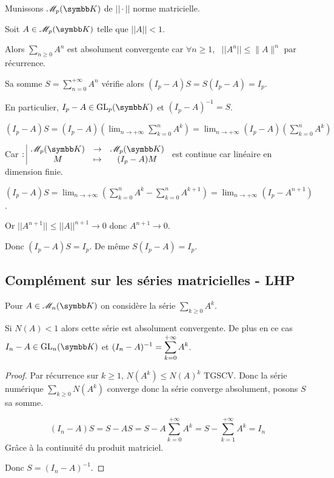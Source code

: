 \begin{exemple}
    Munissons $\mathscr M_p (\K)$ de $|| \cdot ||$ norme matricielle. 

    Soit $A \in \mathscr M_p(\K)$ telle que $|| A || < 1$. 

    Alors $\sum_{n \geqslant 0 } A^n$ est absolument convergente car 
    $\forall n \geqslant 1$, \, $|| A^n || \leqslant \|A\|^n$ par récurrence. 

    Sa somme $\displaystyle S = \sum_{n = 0}^{+ \infty } A^n$ vérifie alors $(I_p - A) S = S(I_p - A) = I_p$.

    En particulier, $I_p - A \in \operatorname{GL}_p (\K)$ et $(I_p - A)^{-1} = S$. 

    $\displaystyle (I_p - A)S = (I_p - A) \left(\lim_{n \to + \infty} \sum_{k = 0 }^{n } A^k \right) = \lim_{n \to + \infty} (I_p - A) \left( \sum_{k = 0}^{n } A^k \right) $

    Car $\fonction {}{\mathscr M_p(\K)}{\mathscr M_p(\K)}{M}{(I_p - A)M}$ est continue car linéaire
    en dimension finie. 

    $\displaystyle (I_p - A)S = \lim_{n \to + \infty} \left( \sum_{k = 0}^{n } A^k - \sum_{k = 0}^{n } A^{k + 1} \right) = \lim_{n \to + \infty} (I_p - A^{n + 1})$.

    Or $|| A^{n + 1} || \leqslant || A ||^{n + 1} \longrightarrow 0$ donc $A^{n + 1} \longrightarrow 0$.

    Donc $(I_p - A)S = I_p$. De même $S(I_p - A) = I_p$.
\end{exemple}

\subsection{Complément sur les séries matricielles - LHP}

Pour $A \in \mathscr M_n(\K)$ on considère la série $\sum_{k \geqslant 0} A^k$.

Si $N(A) < 1$ alors cette série est absolument convergente. De plus en ce cas $I_n - A \in \text{GL}_n(\K)$
et $\displaystyle (I_n - A)^{-1} = \sum_{k=0}^{+ \infty} A^k$.

\begin{proof}
Par récurrence sur $k \geqslant 1$, $N(A^k) \leqslant N(A)^k$ TGSCV.
Donc la série numérique $\sum_{k\geqslant 0} N(A^k)$ converge donc la série converge absolument, posons $S$ sa somme.

\[(I_n - A)S = S - AS = S - A \sum_{k=0}^{+ \infty} A^k = S - \sum_{k=1}^{+ \infty} A^k = I_n\]
Grâce à la continuité du produit matriciel.

Donc $S = (I_n - A)^{-1}$.
\end{proof}

